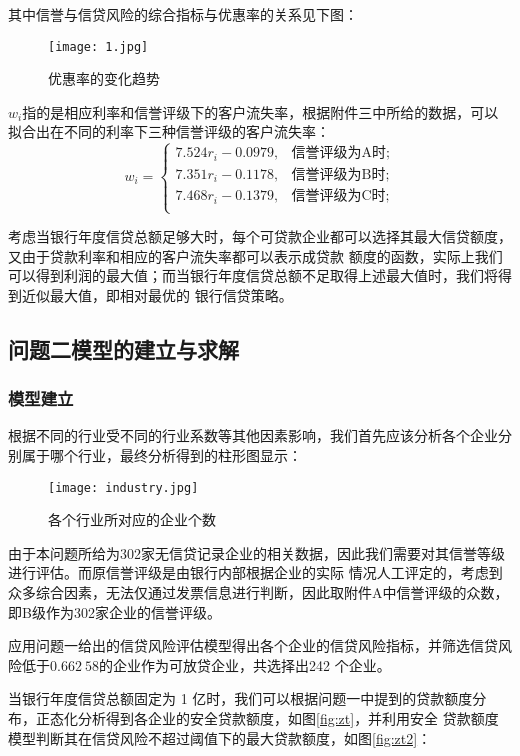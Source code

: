 \documentclass[withoutpreface,bwprint]{cumcmthesis}
\begin{document}
其中信誉与信贷风险的综合指标与优惠率的关系见下图：
\begin{figure}[H]
    \centering
    \texttt{[image: 1.jpg]}
    \caption{优惠率的变化趋势}
    \label{fig:reliability}
\end{figure}

$w_i$指的是相应利率和信誉评级下的客户流失率，根据附件三中所给的数据，可以拟合出在不同的利率下三种信誉评级的客户流失率：
\begin{equation}
    w_i = \begin{cases}
    7.524 r_i-0.0979,  &{\text{信誉评级为A时}};\\
    7.351 r_i-0.1178, &{\text{信誉评级为B时}};\\
    7.468 r_i-0.1379, &{\text{信誉评级为C时}};\\
    \end{cases}
\end{equation}

考虑当银行年度信贷总额足够大时，每个可贷款企业都可以选择其最大信贷额度，又由于贷款利率和相应的客户流失率都可以表示成贷款
额度的函数，实际上我们可以得到利润的最大值；而当银行年度信贷总额不足取得上述最大值时，我们将得到近似最大值，即相对最优的
银行信贷策略。

\subsection{问题二模型的建立与求解}
\subsubsection{模型建立}
根据不同的行业受不同的行业系数等其他因素影响，我们首先应该分析各个企业分别属于哪个行业，最终分析得到的柱形图显示：
\begin{figure}[H]
    \centering
    \texttt{[image: industry.jpg]}
    \caption{各个行业所对应的企业个数}
    \label{fig:industry}
\end{figure}

由于本问题所给为302家无信贷记录企业的相关数据，因此我们需要对其信誉等级进行评估。而原信誉评级是由银行内部根据企业的实际
情况人工评定的，考虑到众多综合因素，无法仅通过发票信息进行判断，因此取附件A中信誉评级的众数，即B级作为302家企业的信誉评级。

应用问题一给出的信贷风险评估模型得出各个企业的信贷风险指标，并筛选信贷风险低于$0.662\ 58$的企业作为可放贷企业，共选择出242
个企业。

当银行年度信贷总额固定为 1 亿时，我们可以根据问题一中提到的贷款额度分布，正态化分析得到各企业的安全贷款额度，如图\ref{fig:zt}，并利用安全
贷款额度模型判断其在信贷风险不超过阈值下的最大贷款额度，如图\ref{fig:zt2}：
\end{document}
